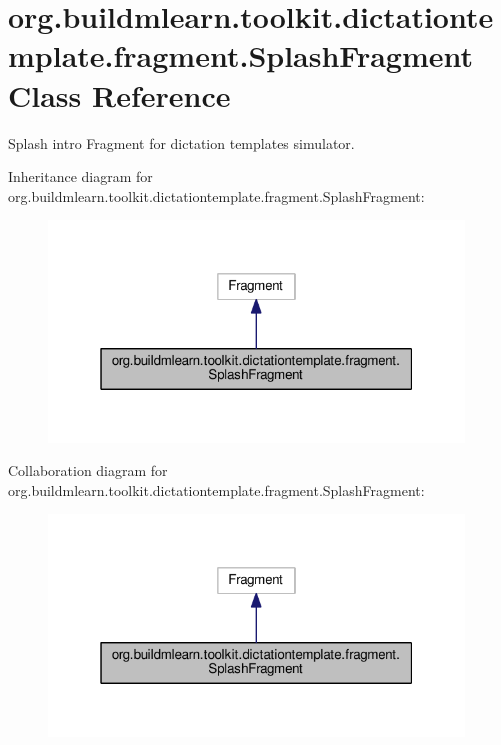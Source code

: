 \hypertarget{classorg_1_1buildmlearn_1_1toolkit_1_1dictationtemplate_1_1fragment_1_1SplashFragment}{}\section{org.\+buildmlearn.\+toolkit.\+dictationtemplate.\+fragment.\+Splash\+Fragment Class Reference}
\label{classorg_1_1buildmlearn_1_1toolkit_1_1dictationtemplate_1_1fragment_1_1SplashFragment}


Splash intro Fragment for dictation template\textquotesingle{}s simulator.  




Inheritance diagram for org.\+buildmlearn.\+toolkit.\+dictationtemplate.\+fragment.\+Splash\+Fragment\+:
\nopagebreak
\begin{figure}[H]
\begin{center}
\leavevmode
\includegraphics[width=313pt]{classorg_1_1buildmlearn_1_1toolkit_1_1dictationtemplate_1_1fragment_1_1SplashFragment__inherit__graph}
\end{center}
\end{figure}


Collaboration diagram for org.\+buildmlearn.\+toolkit.\+dictationtemplate.\+fragment.\+Splash\+Fragment\+:
\nopagebreak
\begin{figure}[H]
\begin{center}
\leavevmode
\includegraphics[width=313pt]{classorg_1_1buildmlearn_1_1toolkit_1_1dictationtemplate_1_1fragment_1_1SplashFragment__coll__graph}
\end{center}
\end{figure}
